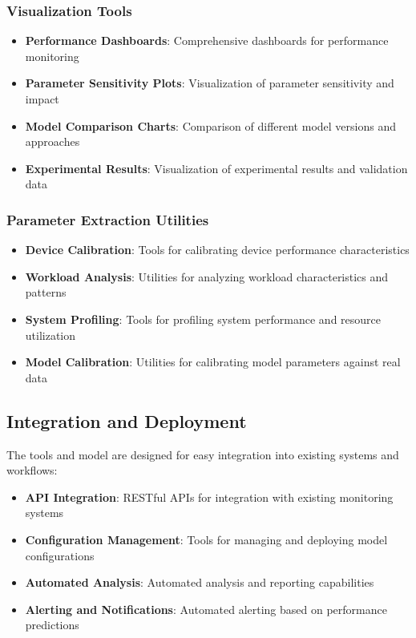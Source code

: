\documentclass[11pt]{article}
\begin{document}
\subsubsection{Visualization Tools}
\begin{itemize}
    \item \textbf{Performance Dashboards}: Comprehensive dashboards for performance monitoring
    \item \textbf{Parameter Sensitivity Plots}: Visualization of parameter sensitivity and impact
    \item \textbf{Model Comparison Charts}: Comparison of different model versions and approaches
    \item \textbf{Experimental Results}: Visualization of experimental results and validation data
\end{itemize}

\subsubsection{Parameter Extraction Utilities}
\begin{itemize}
    \item \textbf{Device Calibration}: Tools for calibrating device performance characteristics
    \item \textbf{Workload Analysis}: Utilities for analyzing workload characteristics and patterns
    \item \textbf{System Profiling}: Tools for profiling system performance and resource utilization
    \item \textbf{Model Calibration}: Utilities for calibrating model parameters against real data
\end{itemize}

\subsection{Integration and Deployment}

The tools and model are designed for easy integration into existing systems and workflows:

\begin{itemize}
    \item \textbf{API Integration}: RESTful APIs for integration with existing monitoring systems
    \item \textbf{Configuration Management}: Tools for managing and deploying model configurations
    \item \textbf{Automated Analysis}: Automated analysis and reporting capabilities
    \item \textbf{Alerting and Notifications}: Automated alerting based on performance predictions
\end{itemize}
\end{document}
